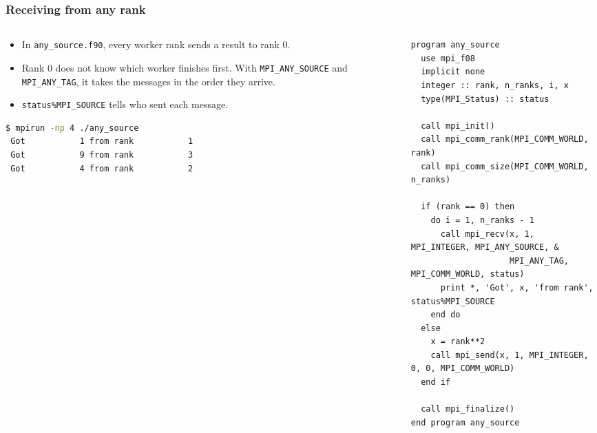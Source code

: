 \begin{frame}[fragile]
  \frametitle{Receiving from any rank}
  \begin{columns}[T]
    \begin{column}{0.4\textwidth}
      \begin{itemize}
        \item In \texttt{any\_source.f90}, every worker rank sends a result to rank 0.
        \item Rank 0 does not know which worker finishes first. With \texttt{MPI\_ANY\_SOURCE} and \texttt{MPI\_ANY\_TAG}, it takes the messages in the order they arrive.
        \item \texttt{status\%MPI\_SOURCE} tells who sent each message.
      \end{itemize}

\begin{lstlisting}[language=bash]
$ mpirun -np 4 ./any_source
 Got           1 from rank           1
 Got           9 from rank           3
 Got           4 from rank           2
\end{lstlisting}
    \end{column}

    \begin{column}{0.6\textwidth}
      \vspace*{-2mm}
\begin{lstlisting}[aboveskip=0pt, belowskip=0pt]
program any_source
  use mpi_f08
  implicit none
  integer :: rank, n_ranks, i, x
  type(MPI_Status) :: status

  call mpi_init()
  call mpi_comm_rank(MPI_COMM_WORLD, rank)
  call mpi_comm_size(MPI_COMM_WORLD, n_ranks)

  if (rank == 0) then
    do i = 1, n_ranks - 1
      call mpi_recv(x, 1, MPI_INTEGER, MPI_ANY_SOURCE, &
                    MPI_ANY_TAG, MPI_COMM_WORLD, status)
      print *, 'Got', x, 'from rank', status%MPI_SOURCE
    end do
  else
    x = rank**2
    call mpi_send(x, 1, MPI_INTEGER, 0, 0, MPI_COMM_WORLD)
  end if

  call mpi_finalize()
end program any_source
\end{lstlisting}
    \end{column}
  \end{columns}
\end{frame}


